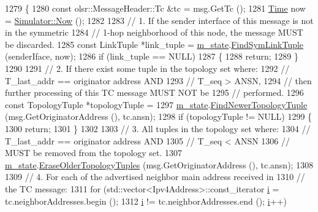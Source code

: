 \begin{DoxyCode}
1279 \{
1280   \textcolor{keyword}{const} olsr::MessageHeader::Tc &tc = msg.GetTc ();
1281   \hyperlink{namespacens3_1_1TracedValueCallback_a7ffd3e7c142ffe7c8a1d2db9b8de38ec}{Time} now = \hyperlink{classns3_1_1Simulator_ac3178fa975b419f7875e7105be122800}{Simulator::Now} ();
1282 
1283   \textcolor{comment}{// 1. If the sender interface of this message is not in the symmetric}
1284   \textcolor{comment}{// 1-hop neighborhood of this node, the message MUST be discarded.}
1285   \textcolor{keyword}{const} LinkTuple *link\_tuple = \hyperlink{classns3_1_1olsr_1_1RoutingProtocol_a07942ec1a7df71b609c8d2ff3b567c49}{m\_state}.\hyperlink{classns3_1_1olsr_1_1OlsrState_a5005529fbbd5fa4a015591a93d715890}{FindSymLinkTuple} (senderIface, now);
1286   \textcolor{keywordflow}{if} (link\_tuple == NULL)
1287     \{
1288       \textcolor{keywordflow}{return};
1289     \}
1290 
1291   \textcolor{comment}{// 2. If there exist some tuple in the topology set where:}
1292   \textcolor{comment}{//    T\_last\_addr == originator address AND}
1293   \textcolor{comment}{//    T\_seq       >  ANSN,}
1294   \textcolor{comment}{// then further processing of this TC message MUST NOT be}
1295   \textcolor{comment}{// performed.}
1296   \textcolor{keyword}{const} TopologyTuple *topologyTuple =
1297     \hyperlink{classns3_1_1olsr_1_1RoutingProtocol_a07942ec1a7df71b609c8d2ff3b567c49}{m\_state}.\hyperlink{classns3_1_1olsr_1_1OlsrState_a6d2971e517b703daede2df48ff3ece15}{FindNewerTopologyTuple} (msg.GetOriginatorAddress (), tc.ansn);
1298   \textcolor{keywordflow}{if} (topologyTuple != NULL)
1299     \{
1300       \textcolor{keywordflow}{return};
1301     \}
1302 
1303   \textcolor{comment}{// 3. All tuples in the topology set where:}
1304   \textcolor{comment}{//    T\_last\_addr == originator address AND}
1305   \textcolor{comment}{//    T\_seq       <  ANSN}
1306   \textcolor{comment}{// MUST be removed from the topology set.}
1307   \hyperlink{classns3_1_1olsr_1_1RoutingProtocol_a07942ec1a7df71b609c8d2ff3b567c49}{m\_state}.\hyperlink{classns3_1_1olsr_1_1OlsrState_ae5a0a2833e66d8e0df0315502e2d7acb}{EraseOlderTopologyTuples} (msg.GetOriginatorAddress (), tc.ansn);
1308 
1309   \textcolor{comment}{// 4. For each of the advertised neighbor main address received in}
1310   \textcolor{comment}{// the TC message:}
1311   \textcolor{keywordflow}{for} (std::vector<Ipv4Address>::const\_iterator \hyperlink{bernuolliDistribution_8m_a6f6ccfcf58b31cb6412107d9d5281426}{i} = tc.neighborAddresses.begin ();
1312        \hyperlink{bernuolliDistribution_8m_a6f6ccfcf58b31cb6412107d9d5281426}{i} != tc.neighborAddresses.end (); \hyperlink{bernuolliDistribution_8m_a6f6ccfcf58b31cb6412107d9d5281426}{i}++)

\end{DoxyCode}
